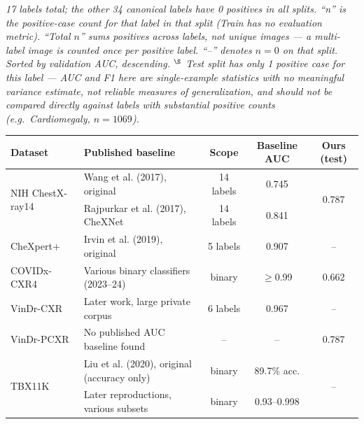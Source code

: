 \documentclass[a4paper,11pt]{article}
\begin{document}
\vspace{4pt}
\footnotesize\textit{17 labels total; the other 34 canonical labels have 0 positives in all splits. ``n'' is the positive-case count for that label in that split (Train has no evaluation metric). ``Total $n$'' sums positives across labels, not unique images --- a multi-label image is counted once per positive label. ``--'' denotes $n=0$ on that split. Sorted by validation AUC, descending. $^\S$ Test split has only 1 positive case for this label --- AUC and F1 here are single-example statistics with no meaningful variance estimate, not reliable measures of generalization, and should not be compared directly against labels with substantial positive counts (e.g.\ Cardiomegaly, $n=1069$).}

\vspace{24pt}

\begin{center}
\label{tab:literature-comparison}

\footnotesize
\renewcommand{\arraystretch}{1.4}
\setlength{\tabcolsep}{5pt}
\begin{tabular}{l l c c c}
\toprule
Dataset & Published baseline & Scope & Baseline AUC & Ours (test) \\
\midrule
\multirow{2}{*}{NIH ChestX-ray14}
  & Wang et al. (2017), original           & 14 labels & 0.745 & \multirow{2}{*}{0.787} \\
  & Rajpurkar et al. (2017), CheXNet       & 14 labels & 0.841 & \\
\midrule
CheXpert+           & Irvin et al. (2019), original    & 5 labels  & 0.907          & -- \\
\midrule
COVIDx-CXR4         & Various binary classifiers (2023--24) & binary    & $\geq$0.99     & 0.662 \\
\midrule
VinDr-CXR           & Later work, large private corpus & 6 labels  & 0.967          & -- \\
\midrule
VinDr-PCXR          & No published AUC baseline found & --        & --             & 0.787 \\
\midrule
\multirow{2}{*}{TBX11K}
  & Liu et al. (2020), original (accuracy only) & binary    & 89.7\% acc.    & \multirow{2}{*}{--} \\
  & Later reproductions, various subsets  & binary    & 0.93--0.998    & \\
\bottomrule
\end{tabular}
\end{center}
\end{document}
